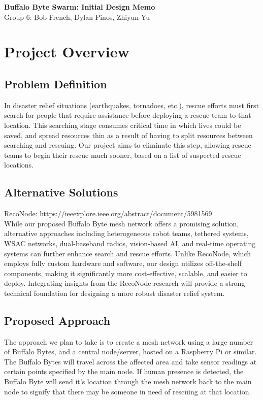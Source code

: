 \documentclass[10pt]{article}
\begin{document}
\begin{center}
	\Large\textbf{Buffalo Byte Swarm: Initial Design Memo}\\[0.1in]
	\large Group 6: Bob French, Dylan Pinos, Zhiyun Yu
\end{center}

\section*{Project Overview}
\subsection*{Problem Definition}
In disaster relief situations (earthquakes, tornadoes, etc.), rescue efforts must first search for people that require assistance before deploying a rescue team to that location. This searching stage consumes critical time in which lives could be saved, and spread resources thin as a result of having to split resources between searching and rescuing. Our project aims to eliminate this step, allowing rescue teams to begin their rescue much sooner, based on a list of suspected rescue locations.
\subsection*{Alternative Solutions}
\underline{RecoNode}: https://ieeexplore.ieee.org/abstract/document/5981569\\[0.5\baselineskip]
While our proposed Buffalo Byte mesh network offers a promising solution, alternative approaches including heterogeneous robot teams, tethered systems, WSAC networks, dual-baseband radios, vision-based AI, and real-time operating systems can further enhance search and rescue efforts. Unlike RecoNode, which employs fully custom hardware and software, our design utilizes off-the-shelf components, making it significantly more cost-effective, scalable, and easier to deploy. Integrating insights from the RecoNode research will provide a strong technical foundation for designing a more robust disaster relief system.
\subsection*{Proposed Approach}
The approach we plan to take is to create a mesh network using a large number of Buffalo Bytes, and a central node/server, hosted on a Raspberry Pi or similar. The Buffalo Bytes will travel across the affected area and take sensor readings at certain points specified by the main node. If human presence is detected, the Buffalo Byte will send it's location through the mesh network back to the main node to signify that there may be someone in need of rescuing at that location.
\end{document}
